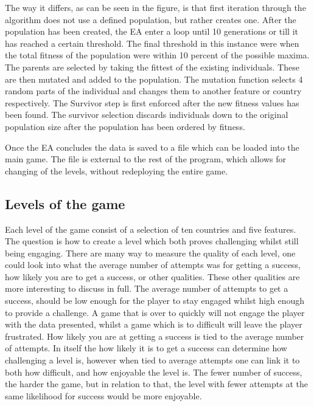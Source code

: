 \documentclass[a4paper,11pt]{article}
\begin{document}
The way it differs, as can be seen in the figure, is that first iteration through the algorithm does not use a defined population, but rather creates one. After the population has been created, the EA enter a loop until 10 generations or till it has reached a certain threshold. The final threshold in this instance were when the total fitness of the population were within 10 percent of the possible maxima. The parents are selected by taking the fittest of the existing individuals. These are then mutated and added to the population. The mutation function selects 4 random parts of the individual and changes them to another feature or country respectively. The Survivor step is first enforced after the new fitness values has been found. The survivor selection discards individuals down to the original population size after the population has been ordered by fitness.

Once the EA concludes the data is saved to a file which can be loaded into the main game. The file is external to the rest of the program, which allows for changing of the levels, without redeploying the entire game.

\subsection{Levels of the game}
\label{meth:levels}
Each level of the game consist of a selection of ten countries and five features. The question is how to create a level which both proves challenging whilst still being engaging. There are many way to measure the quality of each level, one could look into what the average number of attempts was for getting a success, how likely you are to get a success, or other qualities. These other qualities are more interesting to discuss in full. The average number of attempts to get a success, should be low enough for the player to stay engaged whilst high enough to provide a challenge. A game that is over to quickly will not engage the player with the data presented, whilst a game which is to difficult will leave the player frustrated. How likely you are at getting a success is tied to the average number of attempts. In itself the how likely it is to get a success can determine how challenging a level is, however when tied to average attempts one can link it to both how difficult, and how enjoyable the level is. The fewer number of success, the harder the game, but in relation to that, the level with fewer attempts at the same likelihood for success would be more enjoyable.
\end{document}
